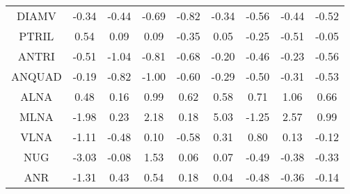 \begin{longtable}{ | c || c | c | c | c | c | c | c || c |}
DIAMV &  \cellcolor[HTML]{FFF7F7} -0.34 &  \cellcolor[HTML]{FFF7F7} -0.44 &  \cellcolor[HTML]{FFEFEF} -0.69 &  \cellcolor[HTML]{FFE7E7} -0.82 &  \cellcolor[HTML]{FFF7F7} -0.34 &  \cellcolor[HTML]{FFEFEF} -0.56 &  \cellcolor[HTML]{FFF7F7} -0.44 &  \cellcolor[HTML]{FFEFEF} -0.52 \\
PTRIL &  \cellcolor[HTML]{EFEFFF} 0.54 &  \cellcolor[HTML]{FFFFFF} 0.09 &  \cellcolor[HTML]{FFFFFF} 0.09 &  \cellcolor[HTML]{FFF7F7} -0.35 &  \cellcolor[HTML]{FFFFFF} 0.05 &  \cellcolor[HTML]{FFF7F7} -0.25 &  \cellcolor[HTML]{FFEFEF} -0.51 &  \cellcolor[HTML]{FFFFFF} -0.05 \\
ANTRI &  \cellcolor[HTML]{FFEFEF} -0.51 &  \cellcolor[HTML]{FFE7E7} -1.04 &  \cellcolor[HTML]{FFE7E7} -0.81 &  \cellcolor[HTML]{FFEFEF} -0.68 &  \cellcolor[HTML]{FFF7F7} -0.20 &  \cellcolor[HTML]{FFF7F7} -0.46 &  \cellcolor[HTML]{FFF7F7} -0.23 &  \cellcolor[HTML]{FFEFEF} -0.56 \\
ANQUAD &  \cellcolor[HTML]{FFF7F7} -0.19 &  \cellcolor[HTML]{FFE7E7} -0.82 &  \cellcolor[HTML]{FFE7E7} -1.00 &  \cellcolor[HTML]{FFEFEF} -0.60 &  \cellcolor[HTML]{FFF7F7} -0.29 &  \cellcolor[HTML]{FFEFEF} -0.50 &  \cellcolor[HTML]{FFF7F7} -0.31 &  \cellcolor[HTML]{FFEFEF} -0.53 \\
ALNA &  \cellcolor[HTML]{EFEFFF} 0.48 &  \cellcolor[HTML]{FFFFFF} 0.16 &  \cellcolor[HTML]{E7E7FF} 0.99 &  \cellcolor[HTML]{EFEFFF} 0.62 &  \cellcolor[HTML]{EFEFFF} 0.58 &  \cellcolor[HTML]{EFEFFF} 0.71 &  \cellcolor[HTML]{E7E7FF} 1.06 &  \cellcolor[HTML]{EFEFFF} 0.66 \\
MLNA &  \cellcolor[HTML]{FFCFCF} -1.98 &  \cellcolor[HTML]{F7F7FF} 0.23 &  \cellcolor[HTML]{C7C7FF} 2.18 &  \cellcolor[HTML]{F7F7FF} 0.18 &  \cellcolor[HTML]{8080FF} 5.03 &  \cellcolor[HTML]{FFDFDF} -1.25 &  \cellcolor[HTML]{BFBFFF} 2.57 &  \cellcolor[HTML]{E7E7FF} 0.99 \\
VLNA &  \cellcolor[HTML]{FFE7E7} -1.11 &  \cellcolor[HTML]{FFEFEF} -0.48 &  \cellcolor[HTML]{FFFFFF} 0.10 &  \cellcolor[HTML]{FFEFEF} -0.58 &  \cellcolor[HTML]{F7F7FF} 0.31 &  \cellcolor[HTML]{E7E7FF} 0.80 &  \cellcolor[HTML]{FFFFFF} 0.13 &  \cellcolor[HTML]{FFFFFF} -0.12 \\
NUG &  \cellcolor[HTML]{FFAFAF} -3.03 &  \cellcolor[HTML]{FFFFFF} -0.08 &  \cellcolor[HTML]{D7D7FF} 1.53 &  \cellcolor[HTML]{FFFFFF} 0.06 &  \cellcolor[HTML]{FFFFFF} 0.07 &  \cellcolor[HTML]{FFEFEF} -0.49 &  \cellcolor[HTML]{FFF7F7} -0.38 &  \cellcolor[HTML]{FFF7F7} -0.33 \\
ANR &  \cellcolor[HTML]{FFDFDF} -1.31 &  \cellcolor[HTML]{F7F7FF} 0.43 &  \cellcolor[HTML]{EFEFFF} 0.54 &  \cellcolor[HTML]{F7F7FF} 0.18 &  \cellcolor[HTML]{FFFFFF} 0.04 &  \cellcolor[HTML]{FFEFEF} -0.48 &  \cellcolor[HTML]{FFF7F7} -0.36 &  \cellcolor[HTML]{FFFFFF} -0.14 \\

\end{longtable}
